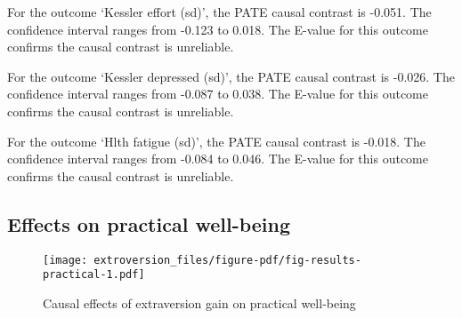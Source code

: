 \documentclass[
  singlecolumn]{report}
\begin{document}
For the outcome `Kessler effort (sd)', the PATE causal contrast is
-0.051. The confidence interval ranges from -0.123 to 0.018. The E-value
for this outcome confirms the causal contrast is unreliable.

For the outcome `Kessler depressed (sd)', the PATE causal contrast is
-0.026. The confidence interval ranges from -0.087 to 0.038. The E-value
for this outcome confirms the causal contrast is unreliable.

For the outcome `Hlth fatigue (sd)', the PATE causal contrast is -0.018.
The confidence interval ranges from -0.084 to 0.046. The E-value for
this outcome confirms the causal contrast is unreliable.

\hypertarget{effects-on-practical-well-being}{%
\subsection{Effects on practical
well-being}\label{effects-on-practical-well-being}}

\begin{figure}

{\centering \texttt{[image: extroversion\_files/figure-pdf/fig-results-practical-1.pdf]}

}

\caption{\label{fig-results-practical}Causal effects of extraversion
gain on practical well-being}

\end{figure}
\end{document}

